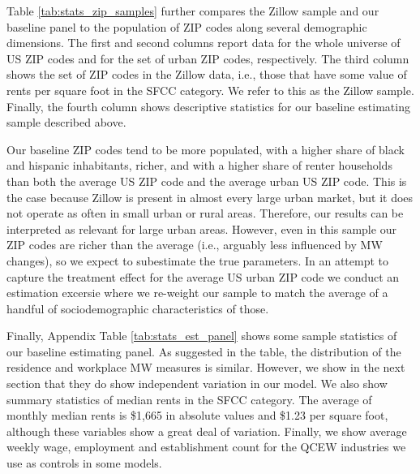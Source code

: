 Table \ref{tab:stats_zip_samples} further compares the Zillow sample and our
baseline panel to the population of ZIP codes along several demographic 
dimensions. 
The first and second columns report data for the whole universe of US ZIP codes 
and for the set of urban ZIP codes, respectively.
The third column shows the set of ZIP codes in the Zillow data, i.e., those 
that have some value of rents per square foot in the SFCC category.
We refer to this as the Zillow sample.
Finally, the fourth column shows descriptive statistics for our baseline 
estimating sample described above.

Our baseline ZIP codes tend to be more populated, with a higher share of black 
and hispanic inhabitants, richer, and with a higher share of renter households 
than both the average US ZIP code and the average urban US ZIP code.
This is the case because Zillow is present in almost every large urban market, 
but it does not operate as often in small urban or rural areas.
Therefore, our results can be interpreted as relevant for large urban areas.
However, even in this sample our ZIP codes are richer than the average 
(i.e., arguably less influenced by MW changes), so we expect to subestimate 
the true parameters.
In an attempt to capture the treatment effect for the average US urban ZIP code 
we conduct an estimation excersie where we re-weight our sample to match the 
average of a handful of sociodemographic characteristics of those.

Finally, Appendix Table \ref{tab:stats_est_panel} shows some sample statistics 
of our baseline estimating panel.
As suggested in the table, the distribution of the residence and workplace MW 
measures is similar.
However, we show in the next section that they do show independent variation
in our model.
We also show summary statistics of median rents in the SFCC category.
The average of monthly median rents is \$1,665 in absolute values and \$1.23 
per square foot, although these variables show a great deal of variation.
Finally, we show average weekly wage, employment and establishment count 
for the QCEW industries we use as controls in some models.
